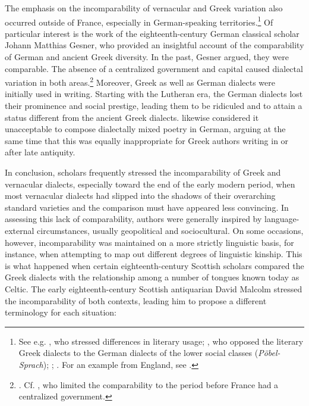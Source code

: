 The emphasis on the incomparability of vernacular and Greek variation also occurred outside of France, especially in German-speaking territories.\footnote{See e.g. \citet[b.2\textsc{\textsuperscript{v}}\textsc{–}b.3\textsc{\textsuperscript{r}}]{Nibbe1725}, who stressed differences in literary usage; \citet[1131--1132]{[frisch]1730}, who opposed the literary Greek dialects to the German dialects of the lower social classes (\textit{Pöbel-Sprach}); \citet[6--8]{[frederick1780}; \citet[203--204]{Ries1786}. For an example from England, see \citet[13--14]{Bayly1756}.} Of particular interest is the work of the eighteenth-century German classical scholar Johann Matthias Gesner, who provided an insightful account of the comparability of German and ancient Greek diversity. In the past, Gesner argued, they were comparable. The absence of a centralized government and capital caused dialectal variation in both areas.\footnote{\citet[160--161]{Gesner1774}. Cf. \citet[lxviii]{Court1778}, who limited the comparability to the period before France had a centralized government.} Moreover, Greek as well as German dialects were initially used in writing. Starting with the Lutheran era, the German dialects lost their prominence and social prestige, leading them to be ridiculed and to attain a status different from the ancient Greek dialects. \citet[162]{Gesner1774} likewise considered it unacceptable to compose dialectally mixed poetry in German, arguing at the same time that this was equally inappropriate for Greek authors writing in or after late antiquity.

In conclusion, scholars frequently stressed the incomparability of Greek and vernacular dialects, especially toward the end of the early modern period, when most vernacular dialects had slipped into the shadows of their overarching standard varieties and the comparison must have appeared less convincing. In assessing this lack of comparability, authors were generally inspired by language-external circumstances, usually geopolitical and sociocultural. On some occasions, however, incomparability was maintained on a more strictly linguistic basis, for instance, when attempting to map out different degrees of linguistic kinship. This is what happened when certain eighteenth-century Scottish scholars compared the Greek dialects with the relationship among a number of tongues known today as Celtic. The early eighteenth-century Scottish antiquarian David Malcolm stressed the incomparability of both contexts, leading him to propose a different terminology for each situation:

